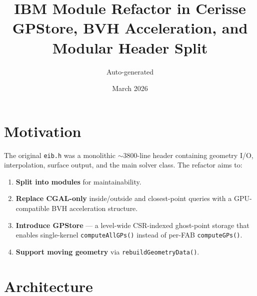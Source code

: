 \documentclass[11pt,a4paper]{article}
\title{\textbf{IBM Module Refactor in Cerisse}\\[4pt]
       \large GPStore, BVH Acceleration, and Modular Header Split}
\author{Auto-generated}
\date{March 2026}
\begin{document}
\maketitle

\section{Motivation}

The original \texttt{eib.h} was a monolithic $\sim$3800-line header
containing geometry I/O, interpolation, surface output, and the main
solver class.  The refactor aims to:

\begin{enumerate}
  \item \textbf{Split into modules} for maintainability.
  \item \textbf{Replace CGAL-only} inside/outside and closest-point
        queries with a GPU-compatible BVH acceleration structure.
  \item \textbf{Introduce GPStore} --- a level-wide CSR-indexed
        ghost-point storage that enables single-kernel
        \texttt{computeAllGPs()} instead of per-FAB
        \texttt{computeGPs()}.
  \item \textbf{Support moving geometry} via \texttt{rebuildGeometryData()}.
\end{enumerate}

\section{Architecture}
\end{document}
